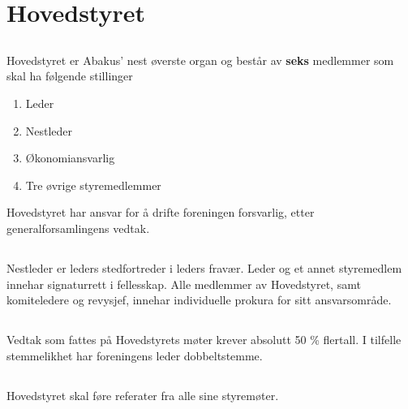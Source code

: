 \section{Hovedstyret}

\subsection{}
Hovedstyret er Abakus’ nest øverste organ og består av \textbf{seks} medlemmer som skal ha følgende stillinger 

\begin{enumerate}[label=\alph*)]
    \item Leder
    \item Nestleder
    \item Økonomiansvarlig
    \item Tre øvrige styremedlemmer
\end{enumerate}
Hovedstyret har ansvar for å drifte foreningen forsvarlig, etter generalforsamlingens vedtak.
\subsection{}
Nestleder er leders stedfortreder i leders fravær. Leder og et annet styremedlem innehar signaturrett i fellesskap. 
Alle medlemmer av Hovedstyret, samt komiteledere og revysjef, innehar individuelle prokura for sitt ansvarsområde. 

\subsection{}
Vedtak som fattes på Hovedstyrets møter krever absolutt 50 \% flertall. I
tilfelle stemmelikhet har foreningens leder dobbeltstemme.

\subsection{}
Hovedstyret skal føre referater fra alle sine styremøter. 
